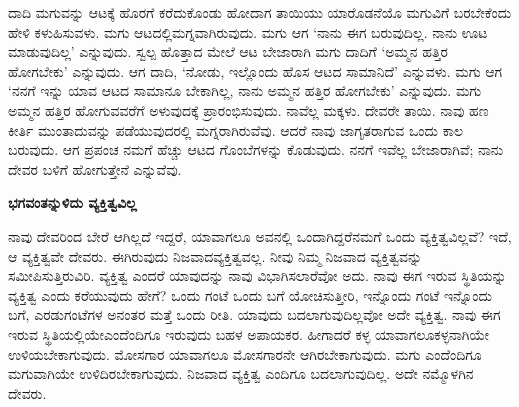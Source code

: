 ದಾದಿ ಮಗುವನ್ನು ಆಟಕ್ಕೆ ಹೊರಗೆ ಕರೆದುಕೊಂಡು ಹೋದಾಗ ತಾಯಿಯು ಯಾರೊಡನೆಯೊ ಮಗುವಿಗೆ ಬರಬೇಕೆಂದು ಹೇಳಿ ಕಳುಹಿಸುವಳು. ಮಗು ಆಟದಲ್ಲಿ\break ಮಗ್ನವಾಗಿರುವುದು. ಮಗು ಆಗ ‘ನಾನು ಈಗ ಬರುವುದಿಲ್ಲ. ನಾನು ಊಟ ಮಾಡುವುದಿಲ್ಲ’ ಎನ್ನುವುದು. ಸ್ವಲ್ಪ ಹೊತ್ತಾದ ಮೇಲೆ ಆಟ ಬೇಜಾರಾಗಿ ಮಗು ದಾದಿಗೆ ‘ಅಮ್ಮನ ಹತ್ತಿರ ಹೋಗಬೇಕು’ ಎನ್ನುವುದು. ಆಗ ದಾದಿ, ‘ನೋಡು, ಇಲ್ಲೊಂದು ಹೊಸ ಆಟದ ಸಾಮಾನಿದೆ’ ಎನ್ನುವಳು. ಮಗು ಆಗ ‘ನನಗೆ ಇನ್ನು ಯಾವ ಆಟದ ಸಾಮಾನೂ ಬೇಕಾಗಿಲ್ಲ, ನಾನು ಅಮ್ಮನ ಹತ್ತಿರ ಹೋಗಬೇಕು’ ಎನ್ನುವುದು. ಮಗು ಅಮ್ಮನ ಹತ್ತಿರ ಹೋಗುವವರೆಗೆ ಅಳುವುದಕ್ಕೆ ಪ್ರಾರಂಭಿಸುವುದು. ನಾವೆಲ್ಲ ಮಕ್ಕಳು. ದೇವರೇ ತಾಯಿ. ನಾವು ಹಣ ಕೀರ್ತಿ ಮುಂತಾದುವನ್ನು ಪಡೆಯುವುದರಲ್ಲಿ ಮಗ್ನರಾಗಿರುವೆವು. ಆದರೆ ನಾವು ಜಾಗೃತರಾಗುವ ಒಂದು ಕಾಲ ಬರುವುದು. ಆಗ ಪ್ರಪಂಚ ನಮಗೆ ಹೆಚ್ಚು ಆಟದ ಗೊಂಬೆಗಳನ್ನು ಕೊಡುವುದು. ನನಗೆ ಇವೆಲ್ಲ ಬೇಜಾರಾಗಿವೆ; ನಾನು ದೇವರ ಬಳಿಗೆ ಹೋಗುತ್ತೇನೆ ಎನ್ನುವೆವು.

\vskip -1cm

\begin{center}
\textbf{ಭಗವಂತನ್ನುಳಿದು ವ್ಯಕ್ತಿತ್ವವಿಲ್ಲ}
\end{center}

ನಾವು ದೇವರಿಂದ ಬೇರೆ ಆಗಿಲ್ಲದೆ ಇದ್ದರೆ, ಯಾವಾಗಲೂ ಅವನಲ್ಲಿ ಒಂದಾಗಿದ್ದರೆ\break ನಮಗೆ ಒಂದು ವ್ಯಕ್ತಿತ್ವವಿಲ್ಲವೆ? ಇದೆ, ಆ ವ್ಯಕ್ತಿತ್ವವೇ ದೇವರು. ಈಗಿರುವುದು ನಿಜವಾದ\break ವ್ಯಕ್ತಿತ್ವವಲ್ಲ. ನೀವು ನಿಮ್ಮ ನಿಜವಾದ ವ್ಯಕ್ತಿತ್ವವನ್ನು ಸಮೀಪಿಸುತ್ತಿರುವಿರಿ. ವ್ಯಕ್ತಿತ್ವ ಎಂದರೆ ಯಾವುದನ್ನು ನಾವು ವಿಭಾಗಿಸಲಾರೆವೋ ಅದು. ನಾವು ಈಗ ಇರುವ ಸ್ಥಿತಿಯನ್ನು ವ್ಯಕ್ತಿತ್ವ ಎಂದು ಕರೆಯುವುದು ಹೇಗೆ? ಒಂದು ಗಂಟೆ ಒಂದು ಬಗೆ ಯೋಚಿಸುತ್ತೀರಿ, ಇನ್ನೊಂದು ಗಂಟೆ ಇನ್ನೊಂದು ಬಗೆ, ಎರಡುಗಂಟೆಗಳ ಅನಂತರ ಮತ್ತೆ ಒಂದು ರೀತಿ. ಯಾವುದು ಬದಲಾಗುವುದಿಲ್ಲವೋ ಅದೇ ವ್ಯಕ್ತಿತ್ವ. ನಾವು ಈಗ ಇರುವ ಸ್ಥಿತಿಯಲ್ಲಿಯೇ\break ಎಂದೆಂದಿಗೂ ಇರುವುದು ಬಹಳ ಅಪಾಯಕರ. ಹೀಗಾದರೆ ಕಳ್ಳ ಯಾವಾಗಲೂ\break ಕಳ್ಳನಾಗಿಯೇ ಉಳಿಯಬೇಕಾಗುವುದು. ಮೋಸಗಾರ ಯಾವಾಗಲೂ ಮೋಸಗಾರನೇ ಆಗಿರಬೇಕಾಗುವುದು. ಮಗು ಎಂದೆಂದಿಗೂ ಮಗುವಾಗಿಯೇ ಉಳಿದಿರಬೇಕಾಗುವುದು. ನಿಜವಾದ ವ್ಯಕ್ತಿತ್ವ ಎಂದಿಗೂ ಬದಲಾಗುವುದಿಲ್ಲ. ಅದೇ ನಮ್ಮೊಳಗಿನ ದೇವರು.

